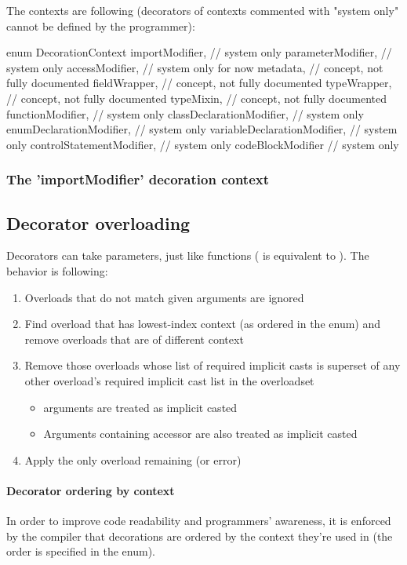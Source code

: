 The contexts are following (decorators of contexts commented with "system only" cannot be defined by the programmer):
\begin{code}
enum DecorationContext {
	importModifier, // system only
	parameterModifier, // system only
	accessModifier, // system only for now
	metadata, // concept, not fully documented
	fieldWrapper, // concept, not fully documented
	typeWrapper, // concept, not fully documented
	typeMixin, // concept, not fully documented
	functionModifier, // system only
	classDeclarationModifier, // system only
	enumDeclarationModifier, // system only
	variableDeclarationModifier, // system only
	controlStatementModifier, // system only
	codeBlockModifier // system only
}
\end{code} \label{enum:DecorationContext}

\subsubsection{The 'importModifier' decoration context}

\subsection{Decorator overloading}
Decorators can take parameters, just like functions ( is equivalent to ). The behavior is following:
\begin{enumerate}
	\item Overloads that do not match given arguments are ignored
	\item Find overload that has lowest-index context (as ordered in the  enum) and remove overloads that are of different context
	\item Remove those overloads whose list of required implicit casts is superset of any other overload's required implicit cast list in the overloadset
	\begin{itemize}
		\item {} arguments are treated as implicit casted
		\item Arguments containing  accessor are also treated as implicit casted
	\end{itemize}
	\item Apply the only overload remaining (or error)
\end{enumerate}

\paragraph{Decorator ordering by context} In order to improve code readability and programmers' awareness, it is enforced by the compiler that decorations are ordered by the context they're used in (the order is specified in the  enum).

